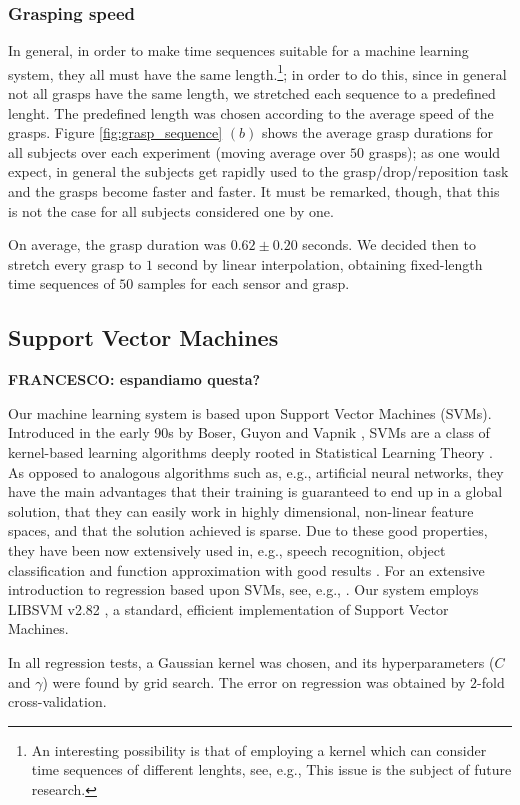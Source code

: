 \subsubsection*{Grasping speed}

In general, in order to make time sequences suitable for a machine
learning system, they all must have the same length.\footnote{An
interesting possibility is that of employing a kernel which can
consider time sequences of different lenghts, see, e.g.,
\cite{shimodaira02dynamic} This issue is the subject of future
research.}; in order to do this, since in general not all grasps have
the same length, we stretched each sequence to a predefined
lenght. The predefined length was chosen according to the average
speed of the grasps. Figure \ref{fig:grasp_sequence} $(b)$ shows the
average grasp durations for all subjects over each experiment (moving
average over $50$ grasps); as one would expect, in general the
subjects get rapidly used to the grasp/drop/reposition task and the
grasps become faster and faster. It must be remarked, though, that
this is not the case for all subjects considered one by one.

On average, the grasp duration was $0.62 \pm 0.20$ seconds. We decided
then to stretch every grasp to $1$ second by linear interpolation,
obtaining fixed-length time sequences of $50$ samples for each sensor
and grasp.

\subsection{Support Vector Machines}

{\bf FRANCESCO: espandiamo questa?}

Our machine learning system is based upon Support Vector Machines
(SVMs). Introduced in the early 90s by Boser, Guyon and Vapnik
\cite{BGV92}, SVMs are a class of kernel-based learning algorithms
deeply rooted in Statistical Learning Theory \cite{v-edbed-82}. As
opposed to analogous algorithms such as, e.g., artificial neural
networks, they have the main advantages that their training is
guaranteed to end up in a global solution, that they can easily work
in highly dimensional, non-linear feature spaces, and that the
solution achieved is sparse. Due to these good properties, they have
been now extensively used in, e.g., speech recognition, object
classification and function approximation with good results
\cite{Cristianini00}. For an extensive introduction to regression
based upon SVMs, see, e.g., \cite{SmolaTut2004}. Our system employs
LIBSVM v2.82 \cite{ChangL01}, a standard, efficient implementation of
Support Vector Machines.

In all regression tests, a Gaussian kernel was chosen, and its
hyperparameters ($C$ and $\gamma$) were found by grid search. The
error on regression was obtained by $2$-fold cross-validation.
